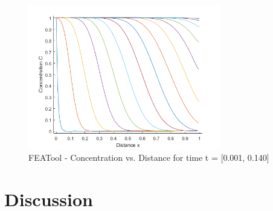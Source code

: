 \documentclass{article}
\begin{document}
\begin{figure}[h!]
\centering
\includegraphics[width=0.75\textwidth]{./img/FEATool_Concentration_vs_Distance.png}
\caption{FEATool - Concentration vs. Distance for time t = [0.001, 0.140]}
\label{fig_PDEPE_Species_vs_Distance}
\end{figure}

\section{Discussion}

\printbibliography[title={References}]
\end{document}
